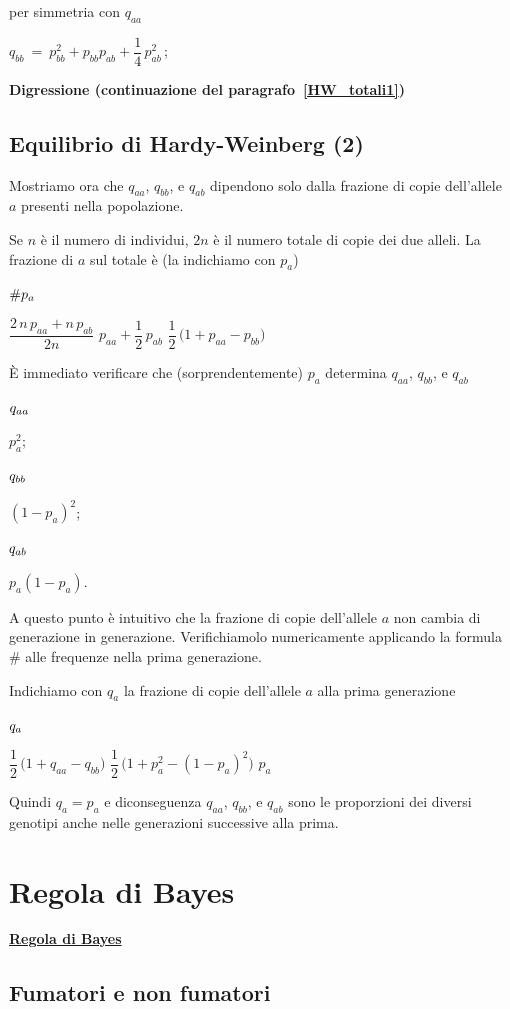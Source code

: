 \documentclass[11pt,openany]{book}
\begin{document}
per simmetria con $q_{aa}$

$q_{bb}\ =\ p_{bb}^2+p_{bb}p_{ab} +\dfrac{1}{4}\,p^2_{ab}\,$;


\hfill{}\clearpage\hfill\textbf{Digressione (continuazione del paragrafo~\ref{HW_totali1})}\subsection{Equilibrio di Hardy-Weinberg (2)}

\def\ceq#1#2#3{\parbox{12ex}{$\displaystyle #1$}\medrel{#2}$\displaystyle  #3$}

Mostriamo ora che $q_{aa}$, $q_{bb}$, e $q_{ab}$ dipendono solo dalla frazione di copie dell'allele $a$ presenti nella popolazione. 

Se $n$ \`e il numero di individui, $2n$ è il numero totale di copie dei due alleli. La frazione di $a$ sul totale è (la indichiamo con $p_a$)

\ceq{\#\hfill p_a}{=}{\dfrac{2\,n\,p_{aa}+n\,p_{ab}}{2n}}
\medrel{=}$p_{aa}+\dfrac12\,p_{ab}$
\medrel{=}$\dfrac12\,\big(1+p_{aa}-p_{bb}\big)$

È immediato verificare che (sorprendentemente) $p_a$ determina  $q_{aa}$, $q_{bb}$, e $q_{ab}$

\ceq{\hfill q_{aa}}{=}{p_a^2};
\ceq{\hfill q_{bb}}{=}{(1-p_a)^2};
\ceq{\hfill q_{ab}}{=}{p_a(1-p_a)}.

A questo punto è intuitivo che la frazione di copie dell'allele $a$ non cambia di generazione in generazione. Verifichiamolo numericamente applicando la formula $\#$ alle frequenze nella prima generazione.

Indichiamo con $q_a$ la frazione di copie dell'allele $a$ alla prima generazione

\ceq{\hfill q_a}{=}{\dfrac12\,\big(1+q_{aa}-q_{bb}\big)}
\medrel{=}$\dfrac12\,\big(1+p^2_{a}-(1-p_{a})^2\big)$
\medrel{=}$p_a$

Quindi $q_a=p_a$ e diconseguenza $q_{aa}$, $q_{bb}$, e $q_{ab}$ sono le proporzioni dei diversi genotipi anche nelle generazioni successive alla prima.


\hfill{}\clearpage\section{Regola di Bayes}
\label{Bayes}
\hfill\textbf{{\color{brown}\hyperref[RegolaBayes]{Regola di Bayes} \faShare}}
\subsection{Fumatori e non fumatori}
\label{Fumatori_Bayes}
\end{document}
